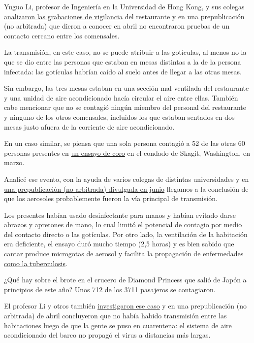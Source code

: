 Yuguo Li, profesor de Ingeniería en la Universidad de Hong Kong, y sus
colegas
\href{https://www.medrxiv.org/content/10.1101/2020.04.16.20067728v1}{analizaron
las grabaciones de vigilancia} del restaurante y en una prepublicación
(no arbitrada) que dieron a conocer en abril no encontraron pruebas de
un contacto cercano entre los comensales.

La transmisión, en este caso, no se puede atribuir a las gotículas, al
menos no la que se dio entre las personas que estaban en mesas distintas
a la de la persona infectada: las gotículas habrían caído al suelo antes
de llegar a las otras mesas.

Sin embargo, las tres mesas estaban en una sección mal ventilada del
restaurante y una unidad de aire acondicionado hacía circular el aire
entre ellas. También cabe mencionar que no se contagió ningún miembro
del personal del restaurante y ninguno de los otros comensales,
incluidos los que estaban sentados en dos mesas justo afuera de la
corriente de aire acondicionado.

En un caso similar, se piensa que una sola persona contagió a 52 de las
otras 60 personas presentes en
\href{https://www.nytimes.com/2020/05/12/health/coronavirus-choir.html}{un
ensayo de coro} en el condado de Skagit, Washington, en marzo.

Analicé ese evento, con la ayuda de varios colegas de distintas
universidades y en
\href{https://www.medrxiv.org/content/10.1101/2020.06.15.20132027v2}{una
prepublicación (no arbitrada) divulgada en junio} llegamos a la
conclusión de que los aerosoles probablemente fueron la vía principal de
transmisión.

Los presentes habían usado desinfectante para manos y habían evitado
darse abrazos y apretones de mano, lo cual limitó el potencial de
contagio por medio del contacto directo o las gotículas. Por otro lado,
la ventilación de la habitación era deficiente, el ensayo duró mucho
tiempo (2,5 horas) y es bien sabido que cantar produce microgotas de
aerosol y
\href{https://www.atsjournals.org/doi/abs/10.1164/arrd.1968.98.2.297}{facilita
la propagación de enfermedades como la tuberculosis}.

¿Qué hay sobre el brote en el crucero de Diamond Princess que salió de
Japón a principios de este año? Unos 712 de los 3711 pasajeros se
contagiaron.

El profesor Li y otros también
\href{https://www.medrxiv.org/content/10.1101/2020.04.09.20059113v1}{investigaron
ese caso} y en una prepublicación (no arbitrada) de abril concluyeron
que no había habido transmisión entre las habitaciones luego de que la
gente se puso en cuarentena: el sistema de aire acondicionado del barco
no propagó el virus a distancias más largas.

